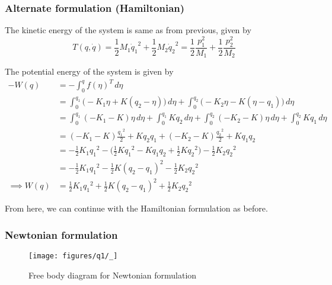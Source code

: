 \clearpage
\subsubsection*{Alternate formulation (Hamiltonian)}

The kinetic energy of the system is same as from previous, given by
\begin{equation*}
    T(q, \dot q)
    =
    \frac{1}{2} M_1 {\dot q_1}^2
    + \frac{1}{2} M_2 {\dot q_2}^2
    =
    \frac{1}{2} \frac{p_1^2}{M_1}
    + \frac{1}{2} \frac{p_2^2}{M_2}
\end{equation*}

The potential energy of the system is given by
\begin{align*}
    - W(q)
     & =
    - \int_{0}^{q} {f(\eta)}^T \, d\eta
    \\ & =
    \int_{0}^{q_1} \Big( -K_1 \eta + K (q_2 - \eta) \Big)\, d\eta
    + \int_{0}^{q_2} \Big( -K_2 \eta - K (\eta - q_1) \Big)\, d\eta
    \\ & =
    \int_{0}^{q_1} (-K_1 - K)\eta \, d\eta
    + \int_{0}^{q_1} K q_2 \, d\eta
    + \int_{0}^{q_2} (-K_2 - K)\eta \, d\eta
    + \int_{0}^{q_2} K q_1 \, d\eta
    \\ & =
    (-K_1 - K) \frac{{q_1}^2}{2} + K q_2 q_1 + (-K_2 - K) \frac{{q_2}^2}{2} + K q_1 q_2
    \\ & =
    -\frac{1}{2} K_1 {q_1}^2 - \Big( \frac{1}{2} K {q_1}^2 - K q_1 q_2 + \frac{1}{2} K {q_2}^2 \Big) - \frac{1}{2} K_2 {q_2}^2
    \\ & =
    -\frac{1}{2} K_1 {q_1}^2 - \frac{1}{2} K {(q_2 - q_1)}^2 - \frac{1}{2} K_2 {q_2}^2
    \\
    \implies W(q)
     & =
    \frac{1}{2} K_1 {q_1}^2 + \frac{1}{2} K {(q_2 - q_1)}^2 + \frac{1}{2} K_2 {q_2}^2
\end{align*}

From here, we can continue with the Hamiltonian formulation as before.

\clearpage
\subsubsection*{Newtonian formulation}

\begin{figure}[htb]
    \centering
    \texttt{[image: figures/q1/\_]}
    \caption{
        Free body diagram for Newtonian formulation
    }\label{fig:q1-newtonian}
\end{figure}

